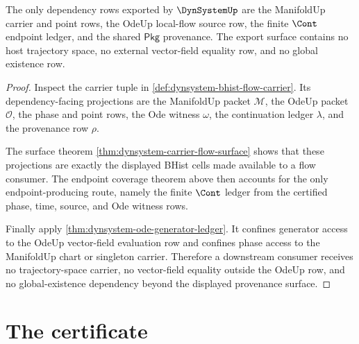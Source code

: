 \begin{theorem}
\label{thm:dynsystem-dependency-provenance-exhaustion}
The only dependency rows exported by $\DynSystemUp$ are the ManifoldUp carrier
and point rows, the OdeUp local-flow source row, the finite $\Cont$ endpoint
ledger, and the shared $\mathsf{Pkg}$ provenance. The export surface contains
no host trajectory space, no external vector-field equality row, and no global
existence row.
\end{theorem}
\begin{proof}
Inspect the carrier tuple in \autoref{def:dynsystem-bhist-flow-carrier}. Its
dependency-facing projections are the ManifoldUp packet $\mathcal{M}$, the
OdeUp packet $\mathcal{O}$, the phase and point rows, the Ode witness
$\omega$, the continuation ledger $\lambda$, and the provenance row $\rho$.

The surface theorem \autoref{thm:dynsystem-carrier-flow-surface} shows that
these projections are exactly the displayed BHist cells made available to a
flow consumer. The endpoint coverage theorem above then accounts for the only
endpoint-producing route, namely the finite $\Cont$ ledger from the certified
phase, time, source, and Ode witness rows.

Finally apply \autoref{thm:dynsystem-ode-generator-ledger}. It confines
generator access to the OdeUp vector-field evaluation row and confines phase
access to the ManifoldUp chart or singleton carrier. Therefore a downstream
consumer receives no trajectory-space carrier, no vector-field equality outside
the OdeUp row, and no global-existence dependency beyond the displayed
provenance surface.
\end{proof}

\section{The certificate}
\label{sec:dynsystem-certificate}

